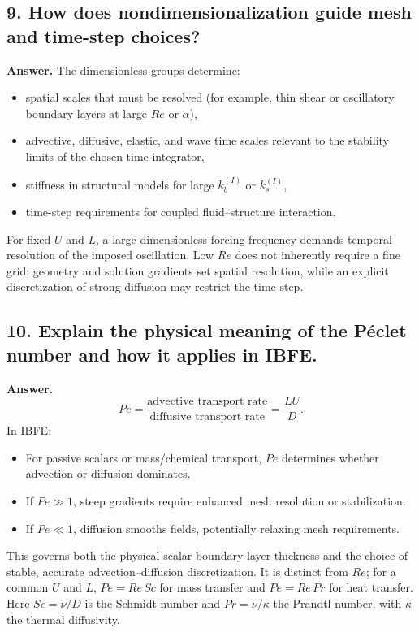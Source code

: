 \documentclass[12pt]{article}
\begin{document}
\subsection*{9. How does nondimensionalization guide mesh and time-step choices?}

\textbf{Answer.}
The dimensionless groups determine:
\begin{itemize}
    \item spatial scales that must be resolved (for example, thin shear or
          oscillatory boundary layers at large $Re$ or $\alpha$),
    \item advective, diffusive, elastic, and wave time scales relevant to the
          stability limits of the chosen time integrator,
    \item stiffness in structural models for large $k_b^{(I)}$ or
          $k_s^{(I)}$,
    \item time-step requirements for coupled fluid–structure interaction.
\end{itemize}
For fixed $U$ and $L$, a large dimensionless forcing frequency demands temporal
resolution of the imposed oscillation. Low $Re$ does not inherently require a
fine grid; geometry and solution gradients set spatial resolution, while an
explicit discretization of strong diffusion may restrict the time step.

\newpage
\subsection*{10. Explain the physical meaning of the Péclet number and how it applies in IBFE.}

\textbf{Answer.}
\[
Pe = \frac{\text{advective transport rate}}
         {\text{diffusive transport rate}}
       = \frac{LU}{D}.
\]
In IBFE:
\begin{itemize}
    \item For passive scalars or mass/chemical transport, $Pe$ determines
          whether advection or diffusion dominates.
    \item If $Pe \gg 1$, steep gradients require enhanced mesh resolution or
          stabilization.
    \item If $Pe \ll 1$, diffusion smooths fields, potentially relaxing mesh
          requirements.
\end{itemize}
This governs both the physical scalar boundary-layer thickness and the choice
of stable, accurate advection--diffusion discretization. It is distinct from
$Re$; for a common $U$ and $L$, $Pe=Re\,Sc$ for mass transfer and
$Pe=Re\,Pr$ for heat transfer. Here $Sc=\nu/D$ is the Schmidt number and
$Pr=\nu/\kappa$ the Prandtl number, with $\kappa$ the thermal diffusivity.
\end{document}

